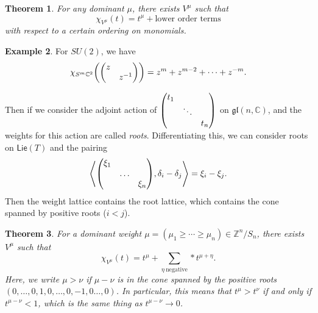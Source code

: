 \documentclass[leqno, openany]{memoir}
\newtheorem{thm}{Theorem}[section]
\theoremstyle{definition}
\newtheorem{exm}[thm]{Example}
\theoremstyle{remark}
\theoremstyle{plain}
\theoremstyle{definition}
\theoremstyle{remark}
\newcommand{\C}{\mathbb{C}}
\newcommand{\Z}{\mathbb{Z}}
\newcommand{\mf}[1]{\mathfrak{#1}}
\newcommand{\ms}[1]{\mathsf{#1}}
\begin{document}
\begin{thm}
    For any dominant $\mu$, there exists $V^{\mu}$ such that 
    \[ \chi_{V^{\mu}}(t) = t^{\mu} + \text{lower order terms} \]
    with respect to a certain ordering on monomials.
\end{thm}

\begin{exm}
    For $SU(2)$, we have
    \[ \chi_{S^m \C^2} \qty( \mqty(\dmat{z, z^{-1}}) ) = z^m + z^{m-2} + \cdots + z^{-m}. \]
\end{exm}

Then if we consider the adjoint action of $\mqty(\dmat{t_1, \ddots, t_n})$ on $\mf{gl}(n, \C)$, and the weights for this action are called \textit{roots}. Differentiating this, we can consider roots on $\ms{Lie}(T)$ and the pairing
\[ \ev{\mqty(\dmat{\xi_1, \ldots, \xi_n}), \delta_i - \delta_j} = \xi_i - \xi_j. \]
Then the weight lattice contains the root lattice, which contains the cone spanned by positive roots ($i < j$). 

\begin{thm}
    For a dominant weight $\mu = (\mu_1 \geq \cdots \geq \mu_n) \in \Z^n / S_n$, there exists $V^{\mu}$ such that 
    \[ \chi_{V^{\mu}}(t) = t^{\mu} + \sum_{\eta\ \text{negative}} * t^{\mu + \eta}. \]
    Here, we write $\mu > \nu$ if $\mu - \nu$ is in the cone spanned by the positive roots $(0, \ldots, 0, 1, 0, \ldots, 0, -1, 0 \ldots, 0)$. In particular, this means that $t^{\mu} > t^{\nu}$ if and only if $t^{\mu - \nu} < 1$, which is the same thing as $t^{\mu-\nu} \to 0$.
\end{thm}
\end{document}
